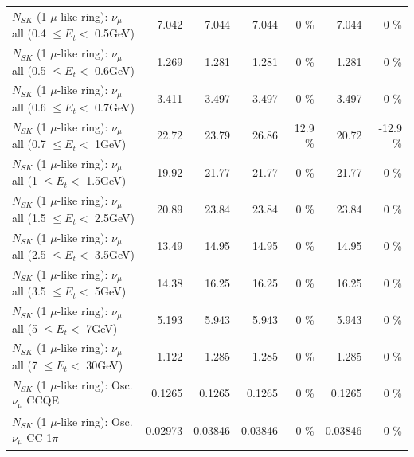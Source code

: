 \begin{table}
\begin{tabular}{| l | r | r | r  r | r  r |}
       $N_{SK}$ (1 $\mu$-like ring): $\nu_{\mu}$ all (0.4 $\leq E_{t} <$ 0.5GeV) &           7.042 &           7.044 &           7.044 &        0 \%  &           7.044 &        0 \%  \\ 
       $N_{SK}$ (1 $\mu$-like ring): $\nu_{\mu}$ all (0.5 $\leq E_{t} <$ 0.6GeV) &           1.269 &           1.281 &           1.281 &        0 \%  &           1.281 &        0 \%  \\ 
       $N_{SK}$ (1 $\mu$-like ring): $\nu_{\mu}$ all (0.6 $\leq E_{t} <$ 0.7GeV) &           3.411 &           3.497 &           3.497 &        0 \%  &           3.497 &        0 \%  \\ 
         $N_{SK}$ (1 $\mu$-like ring): $\nu_{\mu}$ all (0.7 $\leq E_{t} <$ 1GeV) &           22.72 &           23.79 &           26.86 &     12.9 \%  &           20.72 &    -12.9 \%  \\ 
         $N_{SK}$ (1 $\mu$-like ring): $\nu_{\mu}$ all (1 $\leq E_{t} <$ 1.5GeV) &           19.92 &           21.77 &           21.77 &        0 \%  &           21.77 &        0 \%  \\ 
       $N_{SK}$ (1 $\mu$-like ring): $\nu_{\mu}$ all (1.5 $\leq E_{t} <$ 2.5GeV) &           20.89 &           23.84 &           23.84 &        0 \%  &           23.84 &        0 \%  \\ 
       $N_{SK}$ (1 $\mu$-like ring): $\nu_{\mu}$ all (2.5 $\leq E_{t} <$ 3.5GeV) &           13.49 &           14.95 &           14.95 &        0 \%  &           14.95 &        0 \%  \\ 
         $N_{SK}$ (1 $\mu$-like ring): $\nu_{\mu}$ all (3.5 $\leq E_{t} <$ 5GeV) &           14.38 &           16.25 &           16.25 &        0 \%  &           16.25 &        0 \%  \\ 
           $N_{SK}$ (1 $\mu$-like ring): $\nu_{\mu}$ all (5 $\leq E_{t} <$ 7GeV) &           5.193 &           5.943 &           5.943 &        0 \%  &           5.943 &        0 \%  \\ 
          $N_{SK}$ (1 $\mu$-like ring): $\nu_{\mu}$ all (7 $\leq E_{t} <$ 30GeV) &           1.122 &           1.285 &           1.285 &        0 \%  &           1.285 &        0 \%  \\ 
\hline
\hline
                               $N_{SK}$ (1 $\mu$-like ring): Osc. $\nu_\mu$ CCQE &          0.1265 &          0.1265 &          0.1265 &        0 \%  &          0.1265 &        0 \%  \\ 
                          $N_{SK}$ (1 $\mu$-like ring): Osc. $\nu_\mu$ CC 1$\pi$ &         0.02973 &         0.03846 &         0.03846 &        0 \%  &         0.03846 &        0 \%  \\ 

\end{tabular}
\end{table}
